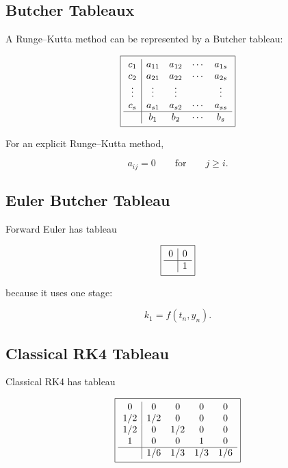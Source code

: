 \subsection{Butcher Tableaux}
\label{subsec:butcher-tableaux}

A Runge--Kutta method can be represented by a Butcher tableau:

\[
\boxed{
\begin{array}{c|cccc}
c_1 & a_{11} & a_{12} & \cdots & a_{1s}\\
c_2 & a_{21} & a_{22} & \cdots & a_{2s}\\
\vdots & \vdots & \vdots & & \vdots\\
c_s & a_{s1} & a_{s2} & \cdots & a_{ss}\\
\hline
& b_1 & b_2 & \cdots & b_s
\end{array}
}
\]

For an explicit Runge--Kutta method,

\[
\boxed{
a_{ij}=0
\qquad
\text{for}
\qquad
j\geq i.
}
\]

\subsection{Euler Butcher Tableau}
\label{subsec:euler-butcher-tableau}

Forward Euler has tableau

\[
\boxed{
\begin{array}{c|c}
0&0\\
\hline
&1
\end{array}
}
\]

because it uses one stage:

\[
k_1=f(t_n,y_n).
\]

\subsection{Classical RK4 Tableau}
\label{subsec:rk4-tableau}

Classical RK4 has tableau

\[
\boxed{
\begin{array}{c|cccc}
0&0&0&0&0\\
1/2&1/2&0&0&0\\
1/2&0&1/2&0&0\\
1&0&0&1&0\\
\hline
&1/6&1/3&1/3&1/6
\end{array}
}
\]

